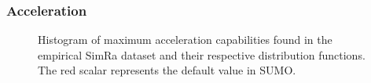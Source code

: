 \subsubsection{Acceleration}
\label{subsubsec:acceleration_preprocessing}
\begin{figure}[t]
    \centering
    \hfill
    \caption{%
        Histogram of maximum acceleration capabilities found in the empirical SimRa dataset and their respective distribution functions.
        The red scalar represents the default value in SUMO.
    }%
    \label{fig:analysis_max_acceleration_dist_fit}
\end{figure}

